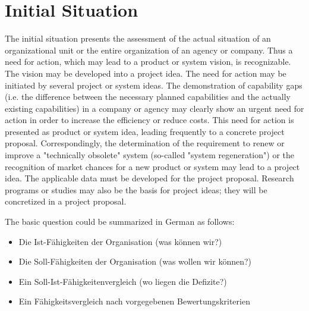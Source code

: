 \documentclass[12pt]{article}
\theoremstyle{definition}
\newenvironment{explanation}{%
   \setlength{\parindent}{0pt}
   \itshape
   \color{blue}
}{}
\begin{document}
\section{Initial Situation}
\begin{explanation}
The initial situation presents the assessment of the actual situation of an organizational unit or the entire organization of an agency or company. Thus a need for action, which may lead to a product or system vision, is recognizable. The vision may be developed into a project idea. The need for action may be initiated by several project or system ideas.
The demonstration of capability gaps (i.e. the difference between the necessary planned capabilities and the actually existing capabilities) in a company or agency may clearly show an urgent need for action in order to increase the efficiency or reduce costs. This need for action is presented as product or system idea, leading frequently to a concrete project proposal. Correspondingly, the determination of the requirement to renew or improve a "technically obsolete" system (so-called "system regeneration") or the recognition of market chances for a new product or system may lead to a project idea. The applicable data must be developed for the project proposal.
Research programs or studies may also be the basis for project ideas; they will be concretized in a project proposal.

The basic question could be summarized in German as follows:
\begin{itemize}
	\item Die Ist-Fähigkeiten der Organisation (was können wir?)
	\item Die Soll-Fähigkeiten der Organisation (was wollen wir können?)
	\item Ein Soll-Ist-Fähigkeitenvergleich (wo liegen die Defizite?)
	\item Ein Fähigkeitsvergleich nach vorgegebenen Bewertungskriterien
\end{itemize}
\end{explanation}
\end{document}
